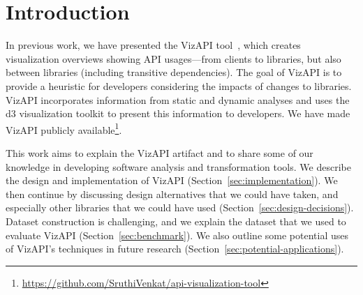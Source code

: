 \section{Introduction}
\label{sec:introduction}

In previous work, we have presented the VizAPI tool~\cite{venkatanarayanan22:_vizap,venkatanarayanan22:_study_lever_api_usage_patter}, which creates visualization overviews showing API usages---from clients to libraries, but also between libraries (including transitive dependencies). The goal of VizAPI is to provide a heuristic for developers considering the impacts of changes to libraries. VizAPI incorporates information from static and dynamic analyses and uses the d3 visualization toolkit to present this information to developers. We have made VizAPI publicly available\footnote{\url{https://github.com/SruthiVenkat/api-visualization-tool}}.

This work aims to explain the VizAPI artifact and to share some of our knowledge in developing software analysis and transformation tools. We describe the design and implementation of VizAPI (Section~\ref{sec:implementation}). We then continue by discussing design alternatives that we could have taken, and especially other libraries that we could have used (Section~\ref{sec:design-decisions}). Dataset construction is challenging, and we explain the dataset that we used to evaluate VizAPI (Section~\ref{sec:benchmark}). We also outline some potential uses of VizAPI's techniques in future research (Section~\ref{sec:potential-applications}).



